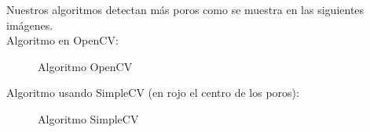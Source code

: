 Nuestros algoritmos detectan más poros como se muestra en las siguientes imágenes. \\
Algoritmo en OpenCV:\@

    \begin{figure}[H]
      \caption{Algoritmo OpenCV}
      \centering \setlength\fboxsep{0pt} \setlength\fboxrule{0.5pt}
    \end{figure}

Algoritmo usando SimpleCV (en rojo el centro de los poros):

    \begin{figure}[H]
      \caption{Algoritmo SimpleCV}
      \centering \setlength\fboxsep{0pt} \setlength\fboxrule{0.5pt}
    \end{figure}

